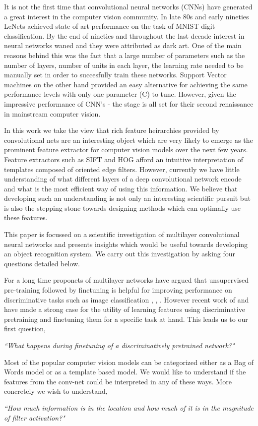\documentclass[runningheads]{llncs}
\begin{document}
It is not the first time that convolutional neural networks (CNNs) have generated a great interest in the computer vision community. In late 80s and early nineties LeNets \cite{Lecun89} achieved state of art performance on the task of MNIST digit classification. By the end of nineties and throughout the last decade interest in neural networks waned and they were attributed as dark art. One of the main reasons behind this was the fact that a large number of parameters such as the number of layers, number of units in each layer, the learning rate needed to be manually set in order to succesfully train these networks. Support Vector machines on the other hand provided an easy alternative for achieving the same performance levels with only one parameter (C) to tune. However, given the impressive performance of CNN's - the stage is all set for their second renaissance in mainstream computer vision. 

In this work we take the view that rich feature heirarchies provided by convolutional nets are an interesting object which are very likely to emerge as the prominent feature extractor for computer vision models over the next few years. Feature extractors such as SIFT and HOG afford an intuitive interpretation of templates composed of oriented edge filters. However, currently we have little understanding of what different layers of a deep convolutional network encode and what is the most efficient way of using this information. We believe that developing such an understanding is not only an interesting scientific pursuit but is also the stepping stone towards designing methods which can optimally use these features.  

This paper is focussed on a scientific investigation of multilayer convolutional neural networks and presents insights which would be useful towards developing an object recognition system. We carry out this investigation by asking four questions detailed below.

For a long time proponets of multilayer networks have argued that unsupervised pre-training followed by finetuning is helpful for improving performance on discriminative tasks such as image classification \cite{GoogleCat}, \cite{DeepPre}, \cite{HintonPre}. However recent work of \cite{Decaf} and \cite{Rcnn} have made a strong case for the utility of learning features using discriminative pretraining and finetuning them for a specific task at hand. This leads us to our first question,
\begin{center}
\textit{``What happens during finetuning of a discriminatively pretrained network?"}
\end{center}
Most of the popular computer vision models can be categorized either as a Bag of Words model or as a template based model. We would like to understand if the features from the conv-net could be interpreted in any of these ways. More concretely we wish to understand, 
\begin{center}
\textit{``How much information is in the location and how much of it is in the magnitude of filter activation?"}
\end{center}
\end{document}
